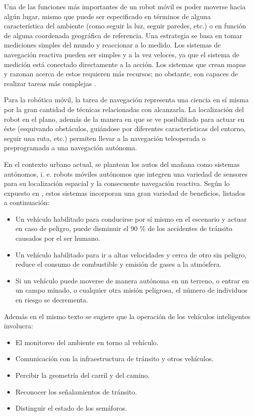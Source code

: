 \par Una de las funciones más importantes de un robot móvil es poder moverse hacia algún lugar, mismo que puede ser especificado en términos de alguna característica del ambiente (como seguir la luz, seguir paredes, etc.) o en función de alguna coordenada geográfica de referencia. Una estrategia se basa en tomar mediciones simples del mundo y reaccionar a lo medido. Los sistemas de navegación reactiva pueden ser simples y a la vez veloces, ya que el sistema de medición está conectado directamente a la acción. Los sistemas que crean mapas y razonan acerca de estos requieren más recursos; no obstante, son capaces de realizar tareas más complejas \cite{corkeRoboticsVisionControl2017}.
\par Para la robótica móvil, la tarea de navegación representa una ciencia en sí misma por la gran cantidad de técnicas relacionadas con alcanzarla. La localización del robot en el plano, además de la manera en que se ve posibilitado para actuar en éste (esquivando obstáculos, guiándose por diferentes características  del entorno, seguir una ruta, etc.) permiten llevar a la navegación teleoperada o preprogramada a una navegación autónoma.
\par En el contexto urbano actual, se plantean los autos del mañana como sistemas autónomos, i. e. robots móviles autónomos que integren una variedad de sensores para su localización espacial y la consecuente navegación reactiva. Según lo expuesto en \cite{heinrichPlanningUniversalOnRoad2018}, estos sistemas incorporan una gran variedad de beneficios, listados a continuación:
\begin{itemize}
	\item Un vehículo habilitado para conducirse por sí mismo en el escenario y actuar en caso de peligro, puede disminuir el 90 \% de los accidentes de tránsito causados por el ser humano.
	\item Un vehículo habilitado para ir a altas velocidades y cerca de otro sin peligro, reduce el consumo de combustible y emisión de gases a la atmósfera.
	\item Si un vehículo puede moverse de manera autónoma en un terreno, o entrar en un campo minado, o cualquier otra misión peligrosa, el número de individuos en riesgo se decrementa.
\end{itemize}
Además en el mismo texto se sugiere que la operación de los vehículos inteligentes involucra:
\begin{itemize}
	\item El monitoreo del ambiente en torno al vehículo.
	\item Comunicación con la infraestructura de tránsito y otros vehículos.
	\item Percibir la geometría del carril y del camino.
	\item Reconocer los señalamientos de tránsito.
	\item Distinguir el estado de los semáforos.
\end{itemize}
